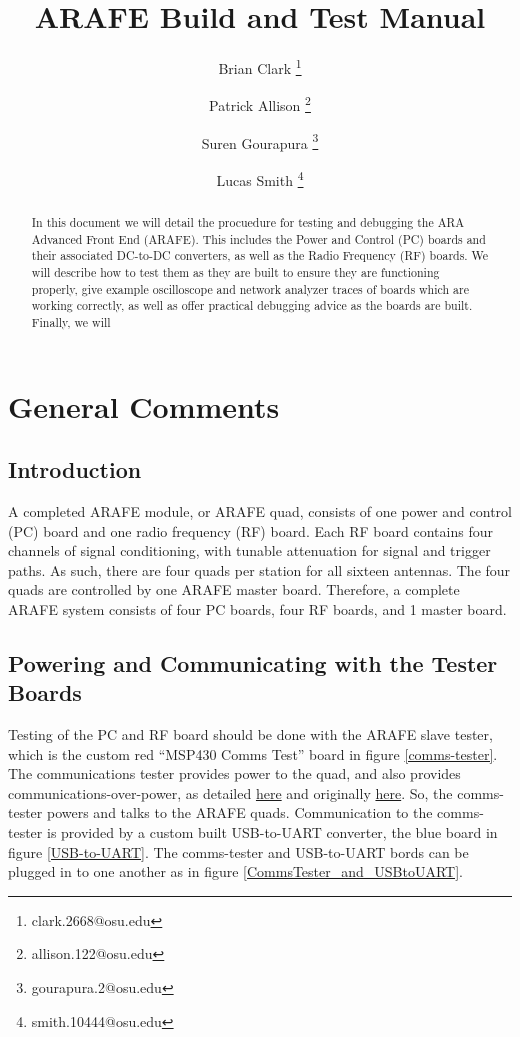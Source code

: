 \documentclass[letter,12pt]{article}
\title{\vspace{-2.0cm}ARAFE Build and Test Manual}
\author[1]{Brian Clark \thanks{clark.2668@osu.edu}}
\author[1]{Patrick Allison \thanks{allison.122@osu.edu}}
\author[1]{Suren Gourapura \thanks{gourapura.2@osu.edu}}
\author[1]{Lucas Smith \thanks{smith.10444@osu.edu}}
\affil[1]{\footnotesize{Department of Physics \& Center for Cosmology and Astroparticle Physics (CCAPP), The Ohio State University}}
\begin{document}
\maketitle

\begin{abstract}
In this document we will detail the procuedure for testing and debugging the ARA Advanced Front End (ARAFE). This includes the Power and Control (PC) boards and their associated DC-to-DC converters, as well as the Radio Frequency (RF) boards. We will describe how to test them as they are built to ensure they are functioning properly, give example oscilloscope and network analyzer traces of boards which are working correctly, as well as offer practical debugging advice as the boards are built. Finally, we will 
\end{abstract}

\tableofcontents
\newpage

\section{General Comments}

\subsection{Introduction}

A completed ARAFE module, or ARAFE quad, consists of one power and control (PC) board and one radio frequency (RF) board. Each RF board contains four channels of signal conditioning, with tunable attenuation for signal and trigger paths. As such, there are four quads per station for all sixteen antennas. The four quads are controlled by one ARAFE master board. Therefore, a complete ARAFE system consists of four PC boards, four RF boards, and 1 master board.

\subsection{Powering and Communicating with the Tester Boards \label{subsec:Powering-and-Communicating-Tester}}

Testing of the PC and RF board should be done with the ARAFE slave tester, which is the custom red ``MSP430 Comms Test'' board in figure \ref{comms-tester}. The communications tester provides power to the quad, and also provides communications-over-power, as detailed \href{https://www.dropbox.com/s/eggk51tj8gkmlpj/arafe_master_stuff.pdf?dl=0}{here} and originally \href{http://electronicdesign.com/communications/simple-circuit-communicates-over-low-voltage-power-lines}{here}. So, the comms-tester powers and talks to the ARAFE quads. Communication to the comms-tester is provided by a custom built USB-to-UART converter, the blue board in figure \ref{USB-to-UART}. The comms-tester and USB-to-UART bords can be plugged in to one another as in figure \ref{CommsTester_and_USBtoUART}. 
\end{document}
